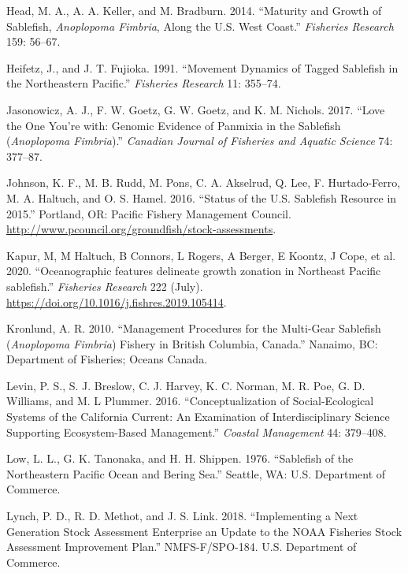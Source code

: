 \documentclass[11pt,
  english,
  a4paper,
]{article}
\begin{document}
\begin{cslreferences}
\leavevmode\hypertarget{ref-head2014fishres}{}%
Head, M. A., A. A. Keller, and M. Bradburn. 2014. ``Maturity and Growth of Sablefish, \emph{Anoplopoma Fimbria}, Along the U.S. West Coast.'' \emph{Fisheries Research} 159: 56--67.

\leavevmode\hypertarget{ref-heifetz1991fishresmovement}{}%
Heifetz, J., and J. T. Fujioka. 1991. ``Movement Dynamics of Tagged Sablefish in the Northeastern Pacific.'' \emph{Fisheries Research} 11: 355--74.

\leavevmode\hypertarget{ref-jasonowicz2017cjfaslove}{}%
Jasonowicz, A. J., F. W. Goetz, G. W. Goetz, and K. M. Nichols. 2017. ``Love the One You're with: Genomic Evidence of Panmixia in the Sablefish (\emph{Anoplopoma Fimbria}).'' \emph{Canadian Journal of Fisheries and Aquatic Science} 74: 377--87.

\leavevmode\hypertarget{ref-johnson2016sablefish}{}%
Johnson, K. F., M. B. Rudd, M. Pons, C. A. Akselrud, Q. Lee, F. Hurtado-Ferro, M. A. Haltuch, and O. S. Hamel. 2016. ``Status of the U.S. Sablefish Resource in 2015.'' Portland, OR: Pacific Fishery Management Council. \url{http://www.pcouncil.org/groundfish/stock-assessments}.

\leavevmode\hypertarget{ref-kapur2020}{}%
Kapur, M, M Haltuch, B Connors, L Rogers, A Berger, E Koontz, J Cope, et al. 2020. ``Oceanographic features delineate growth zonation in Northeast Pacific sablefish.'' \emph{Fisheries Research} 222 (July). \url{https://doi.org/10.1016/j.fishres.2019.105414}.

\leavevmode\hypertarget{ref-kronlund2010}{}%
Kronlund, A. R. 2010. ``Management Procedures for the Multi-Gear Sablefish (\emph{\textup{Anoplopoma Fimbria}}) Fishery in British Columbia, Canada.'' Nanaimo, BC: Department of Fisheries; Oceans Canada.

\leavevmode\hypertarget{ref-levin2016}{}%
Levin, P. S., S. J. Breslow, C. J. Harvey, K. C. Norman, M. R. Poe, G. D. Williams, and M. L Plummer. 2016. ``Conceptualization of Social-Ecological Systems of the California Current: An Examination of Interdisciplinary Science Supporting Ecosystem-Based Management.'' \emph{Coastal Management} 44: 379--408.

\leavevmode\hypertarget{ref-low1976}{}%
Low, L. L., G. K. Tanonaka, and H. H. Shippen. 1976. ``Sablefish of the Northeastern Pacific Ocean and Bering Sea.'' Seattle, WA: U.S. Department of Commerce.

\leavevmode\hypertarget{ref-lynch2018}{}%
Lynch, P. D., R. D. Methot, and J. S. Link. 2018. ``Implementing a Next Generation Stock Assessment Enterprise an Update to the NOAA Fisheries Stock Assessment Improvement Plan.'' NMFS-F/SPO-184. U.S. Department of Commerce.


\end{cslreferences}
\end{document}
